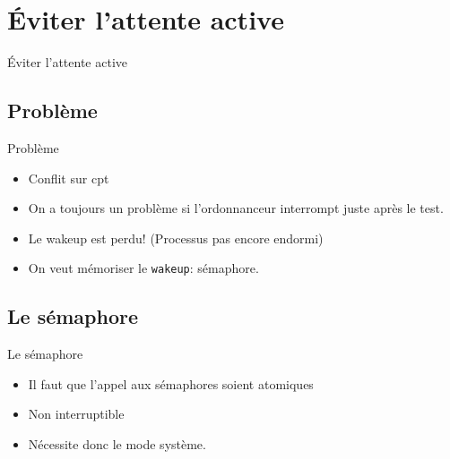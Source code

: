 \def\sectitle{Éviter l'attente active}
\section{\sectitle}

\begin{frame}{\sectitle}
\def\subsectitle{Problème}
\subsection{\subsectitle}
\begin{block}{\subsectitle}
\begin{itemize}
\item Conflit sur cpt
\item On a toujours un problème si l'ordonnanceur interrompt juste après le
test.
\item Le wakeup est perdu! (Processus pas encore endormi)
\item On veut mémoriser le \texttt{wakeup}: sémaphore.
\end{itemize}
\end{block}
\def\subsectitle{Le sémaphore}
\subsection{\subsectitle}
\begin{alertblock}{\subsectitle}
\begin{itemize}
\item Il faut que l'appel aux sémaphores soient atomiques
\item Non interruptible
\item Nécessite donc le mode système.
\end{itemize}
\end{alertblock}
\end{frame}


\def\sectitle{Sémaphore}
